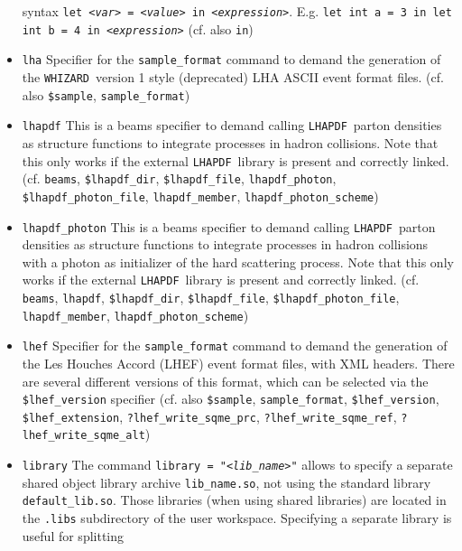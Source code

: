 \documentclass[12pt]{book}
\newcommand{\ttt}[1]{\texttt{#1}}
\newcommand{\whizard}{\ttt{WHIZARD}}
\newcommand{\lhapdf}{\ttt{LHAPDF}}
\begin{document}
\begin{itemize}
syntax \ttt{let {\em <var>} = {\em <value>} in {\em <expression>}}.
E.g. \ttt{let int a = 3 in let int b = 4 in {\em <expression>}}
(cf. also \ttt{in})
\item
\ttt{lha} \newline
Specifier for the \ttt{sample\_format} command to demand the
generation of the \whizard\ version 1 style (deprecated) LHA ASCII event
format files. (cf. also \ttt{\$sample}, \newline
\ttt{sample\_format})
\item
\ttt{lhapdf} \newline
This is a beams specifier to demand calling \lhapdf\ parton densities as
structure functions to integrate processes in hadron collisions. Note
that this only works if the external \lhapdf\ library is present and
correctly linked. (cf. \ttt{beams}, \ttt{\$lhapdf\_dir},
\ttt{\$lhapdf\_file}, \ttt{lhapdf\_photon},
\ttt{\$lhapdf\_photon\_file}, \ttt{lhapdf\_member},
\ttt{lhapdf\_photon\_scheme})
\item
\ttt{lhapdf\_photon} \newline
This is a beams specifier to demand calling \lhapdf\ parton densities as
structure functions to integrate processes in hadron collisions with a
photon as initializer of the hard scattering process. Note
that this only works if the external \lhapdf\ library is present and
correctly linked. (cf. \ttt{beams}, \ttt{lhapdf}, \ttt{\$lhapdf\_dir},
\ttt{\$lhapdf\_file}, \ttt{\$lhapdf\_photon\_file},
\ttt{lhapdf\_member}, \ttt{lhapdf\_photon\_scheme})
\item
\ttt{lhef} \newline
Specifier for the \ttt{sample\_format} command to demand the
generation of the Les Houches Accord (LHEF) event format files, with
XML headers. There are several different versions of this format,
which can be selected via the \ttt{\$lhef\_version} specifier
(cf. also \ttt{\$sample}, \ttt{sample\_format}, \ttt{\$lhef\_version},
\ttt{\$lhef\_extension}, \ttt{?lhef\_write\_sqme\_prc},
\newline \ttt{?lhef\_write\_sqme\_ref}, \ttt{?lhef\_write\_sqme\_alt})
\item
\ttt{library} \newline
The command \ttt{library = "{\em <lib\_name>}"} allows to specify a separate
shared object library archive \ttt{lib\_name.so}, not using the
standard library \ttt{default\_lib.so}. Those libraries (when using
shared libraries) are located in the \ttt{.libs} subdirectory of the
user workspace. Specifying a separate library is useful for splitting

\end{itemize}
\end{document}
